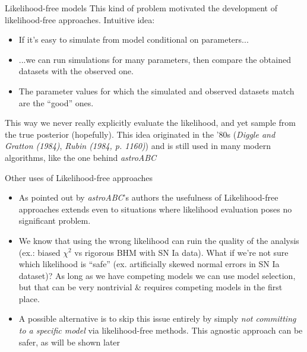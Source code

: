 \documentclass{beamer}
\theoremstyle{remark}
\begin{document}
\begin{frame}{Likelihood-free models}
This kind of problem motivated the development of likelihood-free approaches. Intuitive idea:
\begin{itemize}[<+->]
    \item If it's easy to simulate from model conditional on parameters...
    \item ...we can run simulations for many parameters, then compare the obtained datasets with the observed one.
    \item The parameter values for which the simulated and observed datasets match are the ``good'' ones.
\end{itemize}
\pause[\thebeamerpauses]
This way we never really explicitly evaluate the likelihood, and yet sample from the true posterior (hopefully). This idea originated in the '80s (\textit{Diggle and Gratton (1984)}, \textit{Rubin (1984, p. 1160)}) and is still used in many modern algorithms, like the one behind \textit{astroABC}
\end{frame}
\begin{frame}{Other uses of Likelihood-free approaches}
\begin{itemize}[<+->]
    \item As pointed out by \textit{astroABC}'s authors the usefulness of Likelihood-free approaches extends even to situations where likelihood evaluation poses no significant problem.
    \item We know that using the wrong likelihood can ruin the quality of the analysis (ex.: biased $\chi^2$ vs rigorous BHM with SN Ia data). What if we're not sure which likelihood is ``safe'' (ex. artificially skewed normal errors in SN Ia dataset)? As long as we have competing models we can use model selection, but that can be very nontrivial \& requires competing models in the first place.
    \item A possible alternative is to skip this issue entirely by simply \emph{not committing to a specific model} via likelihood-free methods. This agnostic approach can be safer, as will be shown later
\end{itemize}

\end{frame}
\end{document}
